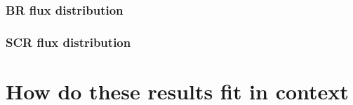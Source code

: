 \subsubsection{BR flux distribution}
\subsubsection{SCR flux distribution}



\section{How do these results fit in context}
%		



